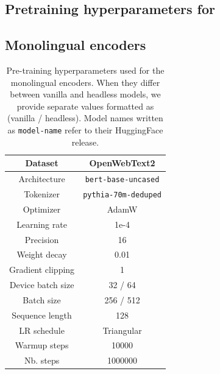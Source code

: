 \begin{appendices}
\clearpage

\section{Pretraining hyperparameters for }
\label{app:train_hp}

\subsection{Monolingual encoders}
\label{app:train_mono_enc}
\begin{table}[H]
\centering
\small
\begin{tabular}{c|c}
\toprule
Dataset & OpenWebText2  \\ \hline
Architecture & \texttt{bert-base-uncased} \\ \hline
Tokenizer & \texttt{pythia-70m-deduped} \\ \hline
Optimizer         & AdamW      \\ \hline
Learning rate     & 1e-4       \\ \hline
Precision  & 16 \\ \hline
Weight decay      & 0.01       \\ \hline
Gradient clipping & 1          \\ \hline
Device batch size        & 32 / 64         \\ \hline
Batch size        & 256 / 512         \\ \hline
Sequence length   & 128        \\ \hline
LR schedule       & Triangular \\ \hline
Warmup steps      & 10000      \\ \hline
Nb. steps         & 1000000        \\ \bottomrule
\end{tabular}
\caption{Pre-training hyperparameters used for the monolingual encoders. When they differ between vanilla and headless models, we provide separate values formatted as (vanilla / headless). Model names written as \texttt{model-name} refer to their HuggingFace release.}
\end{table}


\end{appendices}
